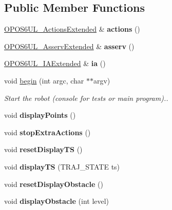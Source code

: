 \subsection*{Public Member Functions}
\begin{DoxyCompactItemize}
\item 
\mbox{\label{classOPOS6UL__RobotExtended_a6468a2bb1fc8de815154a322e038b875}} 
\hyperlink{classOPOS6UL__ActionsExtended}{O\+P\+O\+S6\+U\+L\+\_\+\+Actions\+Extended} \& {\bfseries actions} ()
\item 
\mbox{\label{classOPOS6UL__RobotExtended_a29465c04e6705292119510a57e18b138}} 
\hyperlink{classOPOS6UL__AsservExtended}{O\+P\+O\+S6\+U\+L\+\_\+\+Asserv\+Extended} \& {\bfseries asserv} ()
\item 
\mbox{\label{classOPOS6UL__RobotExtended_aece92ee3684b32eab5bbebba812e1c6b}} 
\hyperlink{classOPOS6UL__IAExtended}{O\+P\+O\+S6\+U\+L\+\_\+\+I\+A\+Extended} \& {\bfseries ia} ()
\item 
\mbox{\label{classOPOS6UL__RobotExtended_a3af6cff5115c7ae70f7a797d9e90e66a}} 
void \hyperlink{classOPOS6UL__RobotExtended_a3af6cff5115c7ae70f7a797d9e90e66a}{begin} (int argc, char $\ast$$\ast$argv)
\begin{DoxyCompactList}\small\item\em Start the robot (console for tests or main program).. \end{DoxyCompactList}\item 
\mbox{\label{classOPOS6UL__RobotExtended_a73821b0ec83f0ebcdccf8c9e999616a0}} 
void {\bfseries display\+Points} ()
\item 
\mbox{\label{classOPOS6UL__RobotExtended_a0a997f7fd88abac1efe0083fce633649}} 
void {\bfseries stop\+Extra\+Actions} ()
\item 
\mbox{\label{classOPOS6UL__RobotExtended_a5297c0c8c1c9b4f25effe72b71ace570}} 
void {\bfseries reset\+Display\+TS} ()
\item 
\mbox{\label{classOPOS6UL__RobotExtended_a4c7e16c32c1eaa463f577c100f63f618}} 
void {\bfseries display\+TS} (T\+R\+A\+J\+\_\+\+S\+T\+A\+TE ts)
\item 
\mbox{\label{classOPOS6UL__RobotExtended_a819ce5f4225f7082d6ce8cf19466dc33}} 
void {\bfseries reset\+Display\+Obstacle} ()
\item 
\mbox{\label{classOPOS6UL__RobotExtended_a9b3f31797fc1916741d6bc61eaf3d1b7}} 
void {\bfseries display\+Obstacle} (int level)
\end{DoxyCompactItemize}
